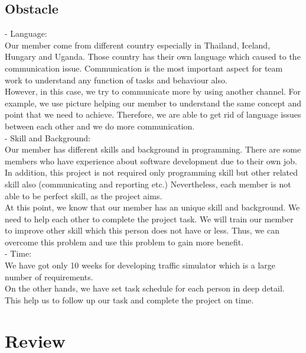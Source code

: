 \documentclass[11pt]{article}
\begin{document}
	\subsection{Obstacle}
		\indent\indent - Language: \\
		\indent\indent Our member come from different country especially in Thailand, Iceland, Hungary and Uganda. Those country has their own language which caused to the communication issue. Communication is the most important aspect for team work to understand any function of tasks and behaviour also. \\
		\indent\indent However, in this case, we try to communicate more by using another channel. For example, we use picture helping our member to understand the same concept and point that we need to achieve. Therefore, we are able to get rid of language issues between each other and we do more communication.  \\     
	\indent - Skill and Background:\\
		\indent\indent Our member has different skills and background in programming. There are some members who have experience about software development due to their own job. In addition, this project is not required only programming skill but other related skill also (communicating and reporting etc.) Nevertheless, each member is not able to be perfect skill, as the project aims. \\
		\indent\indent At this point, we know that our member has an unique skill and background. We need to help each other to complete the project task. We will train our member to improve other skill which this person does not have or less. Thus, we can overcome this problem and use this problem to gain more benefit. \\
	\indent - Time: \\
		\indent\indent We have got only 10 weeks for developing traffic simulator which is a large number of requirements. \\
		\indent\indent On the other hands, we have set task schedule for each person in deep detail. This help us to follow up our task and complete the project on time. 


	
\newpage
\section{Review}
\end{document}
